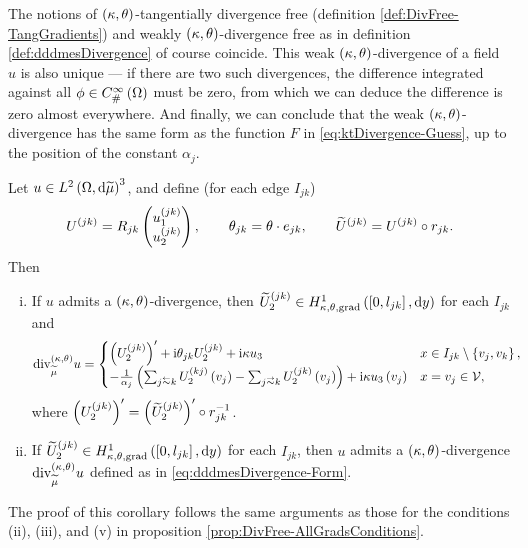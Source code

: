 The notions of $\left( \kappa, \theta \right)$-tangentially divergence free (definition \ref{def:DivFree-TangGradients}) and weakly $\left( \kappa, \theta \right)$-divergence free as in definition \ref{def:dddmesDivergence} of course coincide.
This weak $\left( \kappa, \theta \right)$-divergence of a field $u$ is also unique --- if there are two such divergences, the difference integrated against all $\phi\in C^{\infty}_{\#}\left( \Omega \right)$ must be zero, from which we can deduce the difference is zero almost everywhere.
And finally, we can conclude that the weak $\left( \kappa, \theta \right)$-divergence has the same form as the function $F$ in \eqref{eq:ktDivergence-Guess}, up to the position of the constant $\alpha_j$.
\begin{cory}
	Let $u\in L^{2}\left( \Omega,\mathrm{d} \widetilde{\mu} \right)^3$, and define (for each edge $I_{jk}$)
	\begin{align*}
		U^{(jk)} = R_{jk}\begin{pmatrix} u_1^{(jk)} \\ u_2^{(jk)} \end{pmatrix}, 
		\qquad \theta_{jk} = \theta\cdot e_{jk}, 
		\qquad \widetilde{U}^{(jk)} = U^{(jk)}\circ r_{jk}.
	\end{align*}	
	Then
	\begin{enumerate}[(i)]
		\item If $u$ admits a $\left( \kappa, \theta \right)$-divergence, then $\widetilde{U}_2^{(jk)}\in H^1_{\kappa,\theta,\mathrm{grad}}\left( \left[ 0,l_{jk} \right], \mathrm{d}y \right)$ for each $I_{jk}$ and 
		\begin{align} \label{eq:dddmesDivergence-Form}
			\ktdiv{\dddmes}u &= 
			\begin{cases} 
				\bracs{U_2^{(jk)}}' + \rmi\qm_{jk}U_2^{(jk)} + \rmi\wavenumber u_3 &
				x\in I_{jk}\setminus\clbracs{v_j,v_k}, \\
				-\recip{\alpha_j}\bracs{\sum_{j\conRight k}U_2^{(kj)}\bracs{v_j} - \sum_{j\conLeft k}U_2^{(jk)}\bracs{v_j}} + \rmi\wavenumber u_3\bracs{v_j} &
				x=v_j\in\vertSet,
			\end{cases}
		\end{align}
		where $\left( U_2^{(jk)} \right)' = \left( \widetilde{U}_2^{(jk)} \right)'\circ r_{jk}^{-1}$.
		\item If $\widetilde{U}_2^{(jk)}\in H^1_{\kappa,\theta,\mathrm{grad}}\left( \left[ 0,l_{jk} \right], \mathrm{d}y \right)$ for each $I_{jk}$, then $u$ admits a $\left( \kappa, \theta \right)$-divergence $\mathrm{div}_{\widetilde{\mu}}^{\left( \kappa, \theta \right)}u$ defined as in \eqref{eq:dddmesDivergence-Form}.
	\end{enumerate}
\end{cory}
The proof of this corollary follows the same arguments as those for the conditions (ii), (iii), and (v) in proposition \ref{prop:DivFree-AllGradsConditions}.

